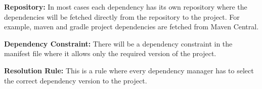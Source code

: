 \textbf{Repository:} In most cases each dependency has its own repository where the dependencies will be fetched directly from the repository to the project. For example, maven and gradle project dependencies are fetched from Maven Central.
	
\textbf{Dependency Constraint:} There will be a dependency constraint in the manifest file where it allows only the required version of the project.
	
\textbf{Resolution Rule:} This is a rule where every dependency manager has to select the correct dependency version to the project.
	


%
